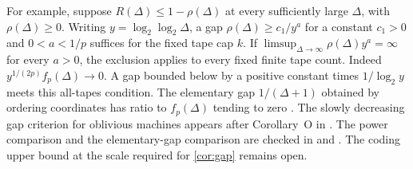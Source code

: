 For example, suppose $R(\Delta)\le1-\rho(\Delta)$ at every sufficiently
large $\Delta$, with $\rho(\Delta)\ge0$. Writing
$y=\log_2\log_2\Delta$, a gap $\rho(\Delta)\ge c_1/y^a$ for a constant
$c_1>0$ and $0<a<1/p$ suffices for the fixed tape cap $k$.
If $\limsup_{\Delta\to\infty}\rho(\Delta)y^a=\infty$ for every $a>0$,
the exclusion applies to every fixed finite tape count. Indeed
$y^{1/(2p)}f_p(\Delta)\to0$. A gap bounded below by a positive
constant times $1/\log_2 y$ meets this all-tapes condition.
The elementary gap $1/(\Delta+1)$ obtained by ordering coordinates
has ratio to $f_p(\Delta)$ tending to zero
\cite[open problems]{PaperThirteen}. The slowly decreasing gap criterion
for oblivious machines appears after Corollary~O in \cite{PaperFourteen}.
The power comparison and the elementary-gap comparison are checked in
 and
.
The coding upper bound at the scale required for \cref{cor:gap} remains open.
